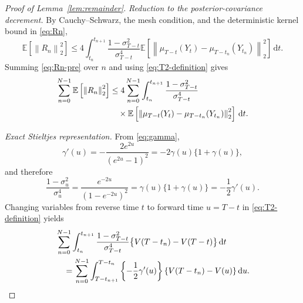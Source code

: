 \documentclass[11pt]{article}
\theoremstyle{definition}
\newcommand{\E}{\mathbb{E}}
\newcommand{\norm}[1]{\left\lVert #1\right\rVert_2}
\newcommand{\dd}{\,\mathrm{d}}
\begin{document}
\begin{proof}[Proof of Lemma~\ref{lem:remainder}]
\medskip\noindent\emph{Reduction to the posterior-covariance decrement.}
By Cauchy--Schwarz, the mesh condition, and the deterministic kernel
bound in \eqref{eq:Rn},
\begin{equation}
    \E\left[\norm{R_n}^2\right]
    \le 4\int_{t_n}^{t_{n+1}}
       \frac{1-\sigma_{T-t}^2}{\sigma_{T-t}^4}
       \E\left[
          \norm{
             \mu_{T-t}(Y_t)-\mu_{T-t_n}(Y_{t_n})
          }^2
       \right]\dd t.
    \label{eq:Rn-pre}
\end{equation}
Summing \eqref{eq:Rn-pre} over $n$ and using
\eqref{eq:T2-definition} gives
\begin{align}
    \sum_{n=0}^{N-1}\E\left[\norm{R_n}^2\right]
    &\le
    4\sum_{n=0}^{N-1}
    \int_{t_n}^{t_{n+1}}
    \frac{1-\sigma_{T-t}^2}{\sigma_{T-t}^4}\notag\\
    &\quad\times
    \E\left[
       \norm{
          \mu_{T-t}(Y_t)-\mu_{T-t_n}(Y_{t_n})
       }^2
    \right]\dd t.
    \label{eq:Rn-by-T2}
\end{align}

\medskip\noindent\emph{Exact Stieltjes representation.}
From \eqref{eq:gamma},
\begin{equation}
    \gamma'(u)
    =-\frac{2e^{2u}}{(e^{2u}-1)^2}
    =-2\gamma(u)\{1+\gamma(u)\},
    \label{eq:gamma-derivative}
\end{equation}
and therefore
\begin{equation}
    \frac{1-\sigma_u^2}{\sigma_u^4}
    =\frac{e^{-2u}}{(1-e^{-2u})^2}
    =\gamma(u)\{1+\gamma(u)\}
    =-\frac12\gamma'(u).
    \label{eq:weight-gamma-derivative}
\end{equation}
Changing variables from reverse time $t$ to forward time $u=T-t$
in \eqref{eq:T2-definition} yields
\begin{align}
    &\sum_{n=0}^{N-1}
    \int_{t_n}^{t_{n+1}}
    \frac{1-\sigma_{T-t}^2}{\sigma_{T-t}^4}
    \bigl\{V(T-t_n)-V(T-t)\bigr\}\dd t\notag\\
    &\quad=
    \sum_{n=0}^{N-1}
    \int_{T-t_{n+1}}^{T-t_n}
    \left\{-\frac12\gamma'(u)\right\}
    \{V(T-t_n)-V(u)\}\dd u.
    \label{eq:T2-forward-time}
\end{align}


\end{proof}
\end{document}
